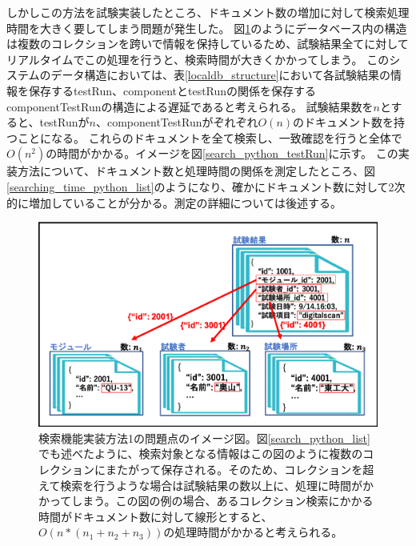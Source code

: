 しかしこの方法を試験実装したところ、ドキュメント数の増加に対して検索処理時間を大きく要してしまう問題が発生した。
図\ref{search_python_list_problem}のようにデータベース内の構造は複数のコレクションを跨いで情報を保持しているため、試験結果全てに対してリアルタイムでこの処理を行うと、検索時間が大きくかかってしまう。
このシステムのデータ構造においては、表\ref{localdb_structure}において各試験結果の情報を保存するtestRun、componentとtestRunの関係を保存するcomponentTestRunの構造による遅延であると考えられる。
試験結果数を$n$とすると、testRunが$n$、componentTestRunがぞれぞれ$O(n)$のドキュメント数を持つことになる。
これらのドキュメントを全て検索し、一致確認を行うと全体で$O(n^2)$の時間がかかる。イメージを図\ref{search_python_testRun}に示す。
この実装方法について、ドキュメント数と処理時間の関係を測定したところ、図\ref{searching_time_python_list}のようになり、確かにドキュメント数に対して2次的に増加していることが分かる。測定の詳細については後述する。
\begin{figure}[bpt]
  \begin{center}
    \includegraphics[width=12cm]{./search_python_list_problem.png}
  \caption[検索機能実装方法1の問題点]
{検索機能実装方法1の問題点のイメージ図。図\ref{search_python_list}でも述べたように、検索対象となる情報はこの図のように複数のコレクションにまたがって保存される。そのため、コレクションを超えて検索を行うような場合は試験結果の数以上に、処理に時間がかかってしまう。この図の例の場合、あるコレクション検索にかかる時間がドキュメント数に対して線形とすると、$O(n*(n_1+n_2+n_3))$の処理時間がかかると考えられる。}
  \label{search_python_list_problem}
  \end{center}
\end{figure}

